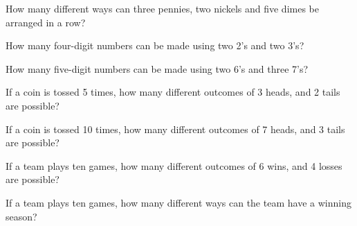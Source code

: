         \begin{puzzle}
        How many different ways can three pennies, two nickels and five dimes be arranged in a row?
        \end{puzzle}

        \begin{puzzle}
            How many four-digit numbers can be made using two 2's and two 3's?
            \end{puzzle}
            
            \begin{puzzle}
            How many five-digit numbers can be made using two 6's and three 7's?
            \end{puzzle}
            
            \begin{puzzle}
            If a coin is tossed 5 times, how many different outcomes of 3 heads, and 2 tails are possible?
            \end{puzzle}
            
            \begin{puzzle}
            If a coin is tossed 10 times, how many different outcomes of 7 heads, and 3 tails are possible?
            \end{puzzle}
            
            \begin{puzzle}
            If a team plays ten games, how many different outcomes of 6 wins, and 4 losses are possible?
            \end{puzzle}
            
            \begin{puzzle}
            If a team plays ten games, how many different ways can the team have a winning season?
            \end{puzzle}
            